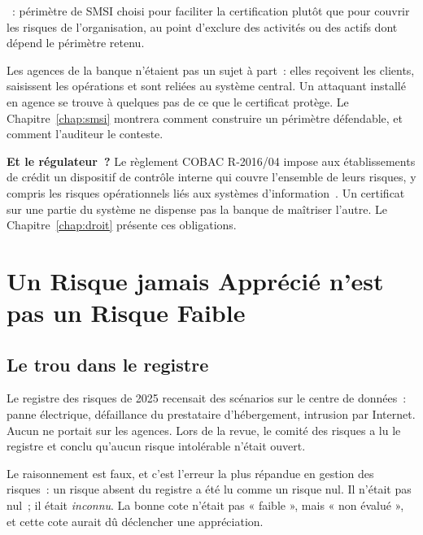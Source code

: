 \begin{boxdef}
~:
périmètre de SMSI choisi pour faciliter la certification plutôt que pour
couvrir les risques de l'organisation, au point d'exclure des activités ou
des actifs dont dépend le périmètre retenu.
\end{boxdef}

Les agences de la banque n'étaient pas un sujet à part~: elles reçoivent les
clients, saisissent les opérations et sont reliées au système central. Un
attaquant installé en agence se trouve à quelques pas de ce que le
certificat protège. Le Chapitre~\ref{chap:smsi} montrera comment construire
un périmètre défendable, et comment l'auditeur le conteste.

\begin{boxinfo}
\textbf{Et le régulateur~?} Le règlement COBAC R-2016/04 impose aux
établissements de crédit un dispositif de contrôle interne qui couvre
l'ensemble de leurs risques, y compris les risques opérationnels liés aux
systèmes d'information~\cite{cobac2016r04}. Un certificat sur une partie du
système ne dispense pas la banque de maîtriser l'autre. Le
Chapitre~\ref{chap:droit} présente ces obligations.
\end{boxinfo}

\section{Un Risque jamais Apprécié n'est pas un Risque Faible}
\label{sec:pro-risque}

\subsection{Le trou dans le registre}

Le registre des risques de 2025 recensait des scénarios sur le centre de
données~: panne électrique, défaillance du prestataire d'hébergement,
intrusion par Internet. Aucun ne portait sur les agences. Lors de la revue,
le comité des risques a lu le registre et conclu qu'aucun risque
intolérable n'était ouvert.

Le raisonnement est faux, et c'est l'erreur la plus répandue en gestion des
risques~: un risque absent du registre a été lu comme un risque nul. Il
n'était pas nul~; il était \emph{inconnu}. La bonne cote n'était pas
« faible », mais « non évalué », et cette cote aurait dû déclencher une
appréciation.

